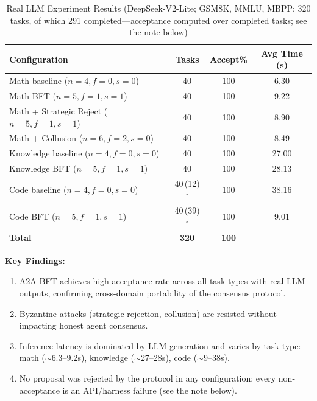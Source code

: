 \documentclass{article}
\begin{document}
\begin{table}[htbp]
\centering
\caption{Real LLM Experiment Results (DeepSeek-V2-Lite; GSM8K, MMLU, MBPP; 320 tasks, of which 291 completed---acceptance computed over completed tasks; see the note below)}
\label{tab:real_llm}
\begin{tabular}{lccc}
\toprule
\textbf{Configuration} & \textbf{Tasks} & \textbf{Accept\%} & \textbf{Avg Time (s)} \\
\midrule
Math baseline ($n=4,f=0,s=0$) & 40 & 100 & 6.30 \\
Math BFT ($n=5,f=1,s=1$) & 40 & 100 & 9.22 \\
Math + Strategic Reject ($n=5,f=1,s=1$) & 40 & 100 & 8.90 \\
Math + Collusion ($n=6,f=2,s=0$) & 40 & 100 & 8.49 \\
Knowledge baseline ($n=4,f=0,s=0$) & 40 & 100 & 27.00 \\
Knowledge BFT ($n=5,f=1,s=1$) & 40 & 100 & 28.13 \\
Code baseline ($n=4,f=0,s=0$) & 40\,(12)$^\star$ & 100 & 38.16 \\
Code BFT ($n=5,f=1,s=1$) & 40\,(39)$^\star$ & 100 & 9.01 \\
\midrule
\textbf{Total} & \textbf{320} & \textbf{100} & -- \\
\bottomrule
\end{tabular}
\end{table}

\textbf{Key Findings:}
\begin{enumerate}
    \item A2A-BFT achieves high acceptance rate across all task types with real LLM outputs, confirming cross-domain portability of the consensus protocol.
    \item Byzantine attacks (strategic rejection, collusion) are resisted without impacting honest agent consensus.
    \item Inference latency is dominated by LLM generation and varies by task type: math ($\sim$6.3--9.2s), knowledge ($\sim$27--28s), code ($\sim$9--38s).
    \item No proposal was rejected by the protocol in any configuration; every non-acceptance is an API/harness failure (see the note below).
\end{enumerate}
\end{document}

